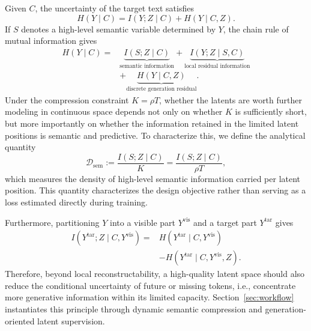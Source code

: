 Given $C$, the uncertainty of the target text satisfies
\begin{equation}
    H(Y\mid C)
    =I(Y;Z\mid C)+H(Y\mid C,Z).
    \label{eq:main-info}
\end{equation}
If $S$ denotes a high-level semantic variable determined by $Y$, the chain rule of mutual information gives
\begin{equation}
\begin{aligned}
    H(Y\mid C)
    ={}&\underbrace{I(S;Z\mid C)}_{\text{semantic information}}
    +\underbrace{I(Y;Z\mid S,C)}_{\text{local residual information}}\\
    &+\underbrace{H(Y\mid C,Z)}_{\text{discrete generation residual}}.
\end{aligned}
\label{eq:main-decomp}
\end{equation}
Under the compression constraint $K=\rho T$, whether the latents are worth further modeling in continuous space depends not only on whether $K$ is sufficiently short, but more importantly on whether the information retained in the limited latent positions is semantic and predictive. To characterize this, we define the analytical quantity
\begin{equation}
    \mathcal D_{\mathrm{sem}}
    :=\frac{I(S;Z\mid C)}{K}
    =\frac{I(S;Z\mid C)}{\rho T},
    \label{eq:main-sem-density}
\end{equation}
which measures the density of high-level semantic information carried per latent position. This quantity characterizes the design objective rather than serving as a loss estimated directly during training.

Furthermore, partitioning $Y$ into a visible part $Y^{\mathrm{vis}}$ and a target part $Y^{\mathrm{tar}}$ gives
\begin{equation}
\begin{aligned}
    I(Y^{\mathrm{tar}};Z\mid C,Y^{\mathrm{vis}})
    ={}&H(Y^{\mathrm{tar}}\mid C,Y^{\mathrm{vis}})\\
    &-H(Y^{\mathrm{tar}}\mid C,Y^{\mathrm{vis}},Z).
\end{aligned}
\label{eq:main-predictive-info}
\end{equation}
Therefore, beyond local reconstructability, a high-quality latent space should also reduce the conditional uncertainty of future or missing tokens, i.e., concentrate more generative information within its limited capacity. Section~\ref{sec:workflow} instantiates this principle through dynamic semantic compression and generation-oriented latent supervision.

